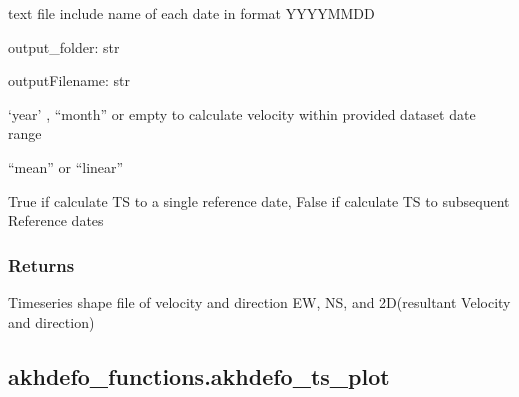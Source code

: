 \documentclass[letterpaper,10pt]{sphinxmanual}
\begin{document}
\begin{fulllineitems}
\begin{description}
\sphinxAtStartPar
text file include name of each date in format YYYYMMDD

\end{description}

\sphinxAtStartPar
output\_folder: str

\sphinxAtStartPar
outputFilename: str
\begin{description}
\sphinxAtStartPar
‘year’ , “month” or empty  to calculate velocity within provided dataset date range

\sphinxAtStartPar
“mean” or “linear”

\sphinxAtStartPar
True if calculate TS to a single reference date, False if calculate TS to subsequent Reference dates

\end{description}


\subsubsection{Returns}
\label{\detokenize{generated/akhdefo_functions.Time_Series:returns}}
\sphinxAtStartPar
Time\sphinxhyphen{}series shape file of velocity and direction EW, NS, and 2D(resultant Velocity and direction)

\end{fulllineitems}


\sphinxstepscope


\subsection{akhdefo\_functions.akhdefo\_ts\_plot}
\label{\detokenize{generated/akhdefo_functions.akhdefo_ts_plot:akhdefo-functions-akhdefo-ts-plot}}\label{\detokenize{generated/akhdefo_functions.akhdefo_ts_plot::doc}}
\end{document}
